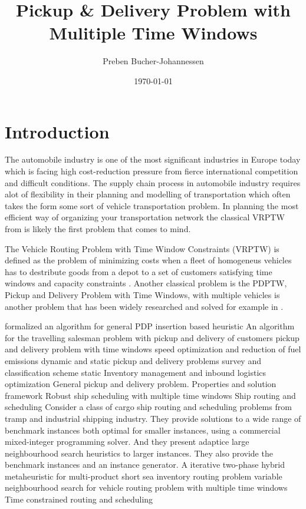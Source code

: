 \documentclass[a4paper,10pt]{article}
\begin{document}
\title{Pickup \& Delivery Problem with Mulitiple Time Windows}
\author{Preben Bucher-Johannessen}
\date{\today}
\maketitle

\tableofcontents
\newpage
{}

\section{Introduction}
The automobile industry is one of the most significant industries in Europe today which is facing high cost-reduction pressure from fierce international competition and difficult conditions.\cite{4flowWeb}
The supply chain process in automobile industry requires alot of flexibility in their planning and modelling of transportation which often takes the form some sort of vehicle transportation problem.
In planning the most efficient way of organizing your transportation network the classical VRPTW from is likely the first problem that comes to mind.

\cite{parragh08}
The Vehicle Routing Problem with Time Window Constraints (VRPTW) is defined as the problem of minimizing costs when a fleet of homogeneus vehicles has to destribute goods from a depot to a set of customers satisfying time windows and capacity constraints \cite{cordeau00}. 
Another classical problem is the PDPTW, Pickup and Delivery Problem with Time Windows, with multiple vehicles is another problem that has been widely researched and solved for example in \cite{nanry00}. 
\par
\cite{solomon87} formalized an algorithm for general PDP
\cite{lu06} insertion based heuristic
\cite{kalantari85} An algorithm for the travelling salesman problem with pickup and delivery of customers
\cite{dumas91} pickup and delivery problem with time windows
\cite{fagerholt10} speed optimization and reduction of fuel emissions
\cite{berbeglia10} dynamic and static pickup and delivery problems survey and classification scheme 
\cite{berbeglia07} static
\cite{zhou13} Inventory management and inbound logistics optimization
\cite{savelsbergh95} General pickup and delivery problem.
\cite{dror89} Properties and solution framework
\cite{christiansen02} Robust ship scheduling with multiple time windows
\cite{christiansen04} Ship routing and scheduling 
\cite{hemmati14} Consider a class of cargo ship routing and scheduling problems from tramp and industrial shipping industry. They provide solutions to a wide range of benchmark instances both optimal for smaller instances, using a commercial mixed-integer programming solver. And they present adaptice large neighbourhood search heuristics to larger instances.  They also provide the benchmark instances and an instance generator.
\cite{hemmati16} A iterative two-phase hybrid metaheuristic for multi-product short sea inventory routing problem
\cite{ferreira18} variable neighbourhood search for vehicle routing problem with multiple time windows
\cite{desrosiers95} Time constrained routing and scheduling
\end{document}

